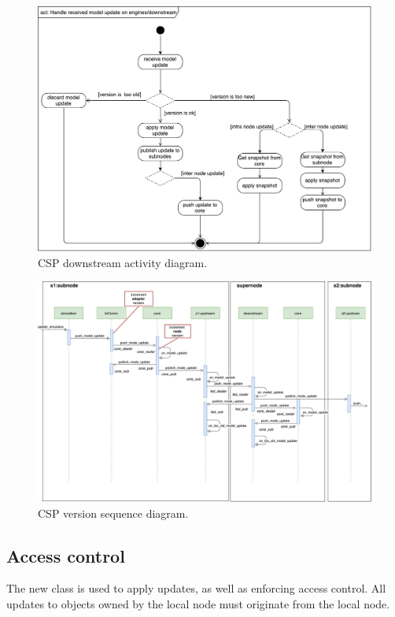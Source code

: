 \begin{figure}[]
	\includegraphics[width=\textwidth]{img/activity_diagram_downstream.pdf}
	\caption{CSP downstream activity diagram.}
	\label{fig:csp:downstream-activty}
\end{figure}

\begin{figure}[]
	\includegraphics[width=\textwidth]{img/sequence_diagram_model_update_pub.pdf}
	\caption{CSP version sequence diagram.}
	\label{fig:csp:version-sequence}
\end{figure}


\subsection{Access control}
The new class  is used to apply
updates, as well as enforcing access control. All updates to objects owned by
the local node must originate from the local node.

